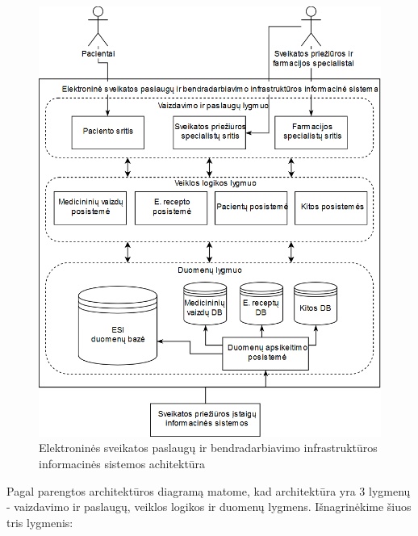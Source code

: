 \begin{figure}[H]
    \centering
    \includegraphics[scale=0.45]{images/ESPBI}
    \caption{Elektroninės sveikatos paslaugų ir bendradarbiavimo infrastruktūros informacinės sistemos achitektūra} 
\end{figure}


Pagal parengtos architektūros diagramą matome, kad architektūra yra 3 lygmenų - vaizdavimo ir paslaugų, veiklos logikos ir duomenų lygmens. Išnagrinėkime šiuos tris lygmenis: 

